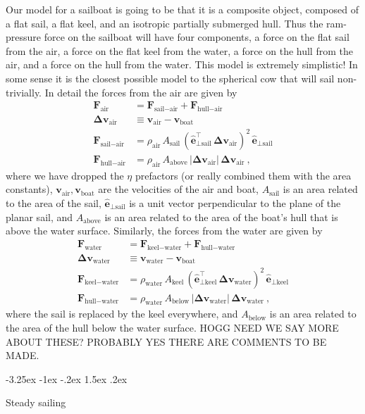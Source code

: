 \documentclass{article}
\makeatletter
\renewcommand{\vec}[1]{\boldsymbol{#1}}
\newcommand{\uvec}{\vec{\hat{e}}}
\newcommand{\air}{\text{air}}
\newcommand{\water}{\text{water}}
\newcommand{\boat}{\text{boat}}
\newcommand{\sail}{\text{sail}}
\newcommand{\keel}{\text{keel}}
\newcommand{\hull}{\text{hull}}
\renewcommand{\above}{\text{above}}
\newcommand{\below}{\text{below}}
\newcommand{\vair}{\vec{v}_\air}
\newcommand{\vwater}{\vec{v}_\water}
\newcommand{\vboat}{\vec{v}_\boat}
\renewcommand\section{\@startsection {section}{1}{\z@}%
  {-3.25ex \@plus -1ex \@minus -.2ex}%
  {1.5ex \@plus .2ex}%
  {\raggedright\normalfont\large\bfseries}}
\makeatother
\begin{document}
Our model for a sailboat is going to be that it is a composite object, composed of a flat sail, a flat keel, and an isotropic partially submerged hull.
Thus the ram-pressure force on the sailboat will have four components, a force on the flat sail from the air, a force on the flat keel from the water, a force on the hull from the air, and a force on the hull from the water.
This model is extremely simplistic!
In some sense it is the closest possible model to the spherical cow that will sail non-trivially.
In detail the forces from the air are given by
\begin{align}
  \vec{F}_\air &= \vec{F}_{\sail-\air} + \vec{F}_{\hull-\air}
  \\
  \vec{\Delta v}_\air &\equiv \vair - \vboat
  \\
  \vec{F}_{\sail-\air} & = \rho_\air\,A_\sail\,(\uvec_{\perp\sail}^\top\,\vec{\Delta v}_\air)^2\,\uvec_{\perp\sail}
  \\
  \vec{F}_{\hull-\air} & = \rho_\air\,A_{\above}\,|\vec{\Delta v}_\air|\,\vec{\Delta v}_\air ~,
\end{align}
where we have dropped the $\eta$ prefactors (or really combined them with the area constants), $\vair,\vboat$ are the velocities of the air and boat, $A_\sail$ is an area related to the area of the sail, $\uvec_{\perp\sail}$ is a unit vector perpendicular to the plane of the planar sail, and $A_{\above}$ is an area related to the area of the boat's hull that is above the water surface.
Similarly, the forces from the water are given by
\begin{align}
  \vec{F}_\water &= \vec{F}_{\keel-\water} + \vec{F}_{\hull-\water}
  \\
  \vec{\Delta v}_\water &\equiv \vwater - \vboat
  \\
  \vec{F}_{\keel-\water} & = \rho_\water\,A_\keel\,(\uvec_{\perp\keel}^\top\,\vec{\Delta v}_\water)^2\,\uvec_{\perp\keel}
  \\
  \vec{F}_{\hull-\water} & = \rho_\water\,A_{\below}\,|\vec{\Delta v}_\water|\,\vec{\Delta v}_\water ~,
\end{align}
where the sail is replaced by the keel everywhere, and $A_{\below}$ is an area related to the area of the hull below the water surface.
HOGG NEED WE SAY MORE ABOUT THESE? PROBABLY YES THERE ARE COMMENTS TO BE MADE.

\section{Steady sailing}\label{sec:steady}
\end{document}
